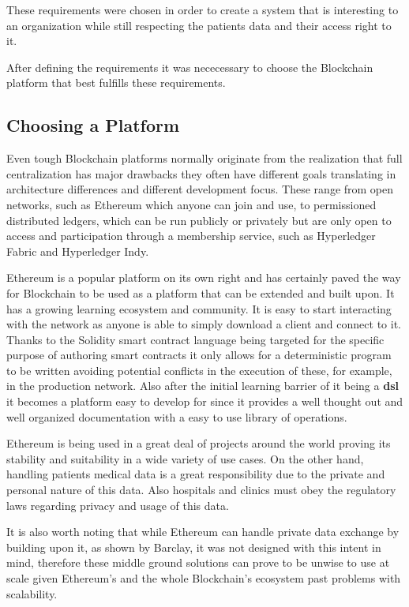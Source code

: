These requirements were chosen in order to create a system that is interesting
to an organization while still respecting the patients data and their access
right to it. 

After defining the requirements it was nececessary to choose the Blockchain
platform that best fulfills these requirements.


\subsection{Choosing a Platform}\label{choosePlatform}

Even tough Blockchain platforms normally originate from the realization that
full centralization has major drawbacks they often have different goals
translating in architecture differences and different development focus.  These
range from open networks, such as Ethereum which anyone can join and use, to
permissioned distributed ledgers, which can be run publicly or privately but
are only open to access and participation through a membership service, such as
Hyperledger Fabric and Hyperledger Indy.

Ethereum is a popular platform on its own right and has certainly paved the way
for Blockchain to be used as a platform that can be extended and built upon. It
has a growing learning ecosystem and community. It is easy to start interacting
with the network as anyone is able to simply download a client and connect to
it.  Thanks to the Solidity smart contract language being targeted for the
specific purpose of authoring smart contracts it only allows for a
deterministic program to be written avoiding potential conflicts in the
execution of these, for example, in the production network. Also after the
initial learning barrier of it being a \textbf{dsl} it becomes a platform easy
to develop for since it provides a well thought out and well organized
documentation with a easy to use library of operations.

Ethereum is being used in a great deal of projects around the world proving its
stability and suitability in a wide variety of use cases. On the other hand,
handling patients medical data is a great responsibility due to the private and
personal nature of this data. Also hospitals and clinics must obey the
regulatory laws regarding privacy and usage of this data.

It is also worth noting that while Ethereum can handle private data exchange by
building upon it, as shown by Barclay, it was not designed with this intent in
mind, therefore these middle ground solutions can prove to be unwise to use at
scale given Ethereum's and the whole Blockchain's ecosystem past problems with
scalability.  

